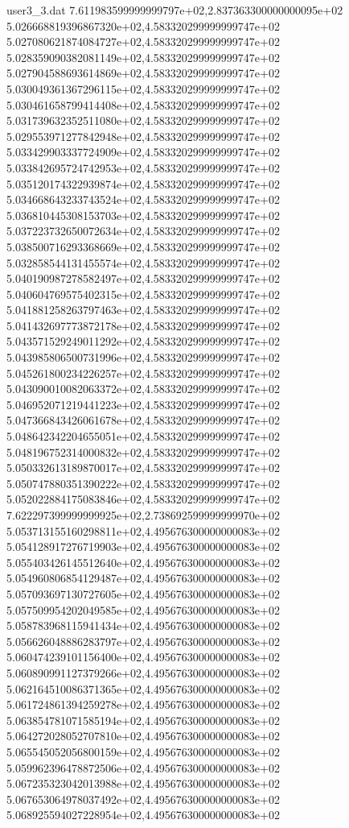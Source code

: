 \begin{filecontents}{user3_3.dat}
7.611983599999999797e+02,2.837363300000000095e+02
5.026668819396867320e+02,4.583320299999999747e+02
5.027080621874084727e+02,4.583320299999999747e+02
5.028359090382081149e+02,4.583320299999999747e+02
5.027904588693614869e+02,4.583320299999999747e+02
5.030049361367296115e+02,4.583320299999999747e+02
5.030461658799414408e+02,4.583320299999999747e+02
5.031739632352511080e+02,4.583320299999999747e+02
5.029553971277842948e+02,4.583320299999999747e+02
5.033429903337724909e+02,4.583320299999999747e+02
5.033842695724742953e+02,4.583320299999999747e+02
5.035120174322939874e+02,4.583320299999999747e+02
5.034668643233743524e+02,4.583320299999999747e+02
5.036810445308153703e+02,4.583320299999999747e+02
5.037223732650072634e+02,4.583320299999999747e+02
5.038500716293368669e+02,4.583320299999999747e+02
5.032858544131455574e+02,4.583320299999999747e+02
5.040190987278582497e+02,4.583320299999999747e+02
5.040604769575402315e+02,4.583320299999999747e+02
5.041881258263797463e+02,4.583320299999999747e+02
5.041432697773872178e+02,4.583320299999999747e+02
5.043571529249011292e+02,4.583320299999999747e+02
5.043985806500731996e+02,4.583320299999999747e+02
5.045261800234226257e+02,4.583320299999999747e+02
5.043090010082063372e+02,4.583320299999999747e+02
5.046952071219441223e+02,4.583320299999999747e+02
5.047366843426061678e+02,4.583320299999999747e+02
5.048642342204655051e+02,4.583320299999999747e+02
5.048196752314000832e+02,4.583320299999999747e+02
5.050332613189870017e+02,4.583320299999999747e+02
5.050747880351390222e+02,4.583320299999999747e+02
5.052022884175083846e+02,4.583320299999999747e+02
7.622297399999999925e+02,2.738692599999999970e+02
5.053713155160298811e+02,4.495676300000000083e+02
5.054128917276719903e+02,4.495676300000000083e+02
5.055403426145512640e+02,4.495676300000000083e+02
5.054960806854129487e+02,4.495676300000000083e+02
5.057093697130727605e+02,4.495676300000000083e+02
5.057509954202049585e+02,4.495676300000000083e+02
5.058783968115941434e+02,4.495676300000000083e+02
5.056626048886283797e+02,4.495676300000000083e+02
5.060474239101156400e+02,4.495676300000000083e+02
5.060890991127379266e+02,4.495676300000000083e+02
5.062164510086371365e+02,4.495676300000000083e+02
5.061724861394259278e+02,4.495676300000000083e+02
5.063854781071585194e+02,4.495676300000000083e+02
5.064272028052707810e+02,4.495676300000000083e+02
5.065545052056800159e+02,4.495676300000000083e+02
5.059962396478872506e+02,4.495676300000000083e+02
5.067235323042013988e+02,4.495676300000000083e+02
5.067653064978037492e+02,4.495676300000000083e+02
5.068925594027228954e+02,4.495676300000000083e+02

\end{filecontents}
